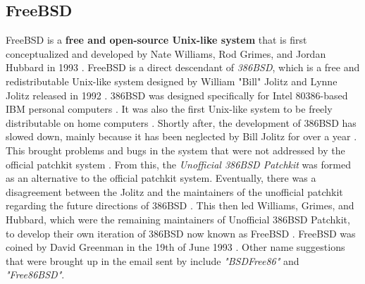 \subsection{FreeBSD} \label{freebsd}

FreeBSD is a \textbf{free and open-source Unix-like system} that is first conceptualized and developed by Nate Williams,
Rod Grimes, and Jordan Hubbard in 1993 \parencite{freebsd_intro}. FreeBSD is a direct descendant of \textit{386BSD}, which is
a free and redistributable Unix-like system designed by William "Bill" Jolitz and Lynne Jolitz released in 1992 \parencite{bentson1995}.
386BSD was designed specifically for Intel 80386-based IBM personal computers \parencites{mckusick1999}{bentson1995}.
It was also the first Unix-like system to be freely distributable on home computers \parencite{bentson1995}.
Shortly after, the development of 386BSD has slowed down, mainly because it has been neglected by Bill Jolitz for
over a year \parencite{mckusick1999}. This brought problems and bugs in the system that were not addressed by
the official patchkit system \parencite{freebsd_intro}. From this, the \textit{Unofficial 386BSD Patchkit} was formed \parencite{jude2020}
as an alternative to the official patchkit system. Eventually, there was a disagreement between the Jolitz and
the maintainers of the unofficial patchkit regarding the future directions of 386BSD \parencite{jolitz2014}.
This then led Williams, Grimes, and Hubbard, which were the remaining maintainers of Unofficial 386BSD Patchkit,
to develop their own iteration of 386BSD now known as FreeBSD \parencite{freebsd_intro}. FreeBSD was coined by David Greenman
in the 19th of June 1993 \parencite{greenman1993}. Other name suggestions that were brought up in the email sent by
\textcite{greenman1993} include \textit{"BSDFree86"} and \textit{"Free86BSD"}.

